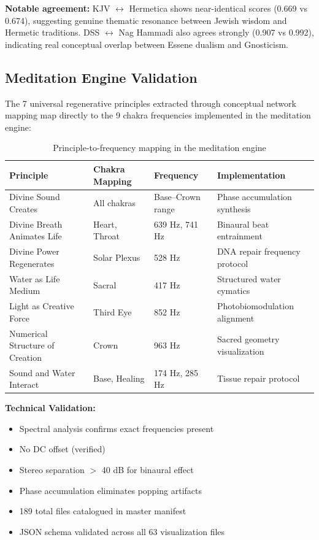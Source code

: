 \documentclass[11pt]{article}
\begin{document}
\textbf{Notable agreement:} KJV $\leftrightarrow$ Hermetica shows near-identical scores (0.669 vs 0.674), suggesting genuine thematic resonance between Jewish wisdom and Hermetic traditions. DSS $\leftrightarrow$ Nag Hammadi also agrees strongly (0.907 vs 0.992), indicating real conceptual overlap between Essene dualism and Gnosticism.

\subsection{Meditation Engine Validation}

The 7 universal regenerative principles extracted through conceptual network mapping map directly to the 9 chakra frequencies implemented in the meditation engine:

\begin{table}[h]
\centering
\begin{tabular}{@{}llll@{}}
\toprule
Principle & Chakra Mapping & Frequency & Implementation \\
\midrule
Divine Sound Creates & All chakras & Base--Crown range & Phase accumulation synthesis \\
Divine Breath Animates Life & Heart, Throat & 639 Hz, 741 Hz & Binaural beat entrainment \\
Divine Power Regenerates & Solar Plexus & 528 Hz & DNA repair frequency protocol \\
Water as Life Medium & Sacral & 417 Hz & Structured water cymatics \\
Light as Creative Force & Third Eye & 852 Hz & Photobiomodulation alignment \\
Numerical Structure of Creation & Crown & 963 Hz & Sacred geometry visualization \\
Sound and Water Interact & Base, Healing & 174 Hz, 285 Hz & Tissue repair protocol \\
\bottomrule
\end{tabular}
\caption{Principle-to-frequency mapping in the meditation engine}
\end{table}

\textbf{Technical Validation:}
\begin{itemize}
    \item Spectral analysis confirms exact frequencies present
    \item No DC offset (verified)
    \item Stereo separation $>$ 40 dB for binaural effect
    \item Phase accumulation eliminates popping artifacts
    \item 189 total files catalogued in master manifest
    \item JSON schema validated across all 63 visualization files
\end{itemize}
\end{document}
